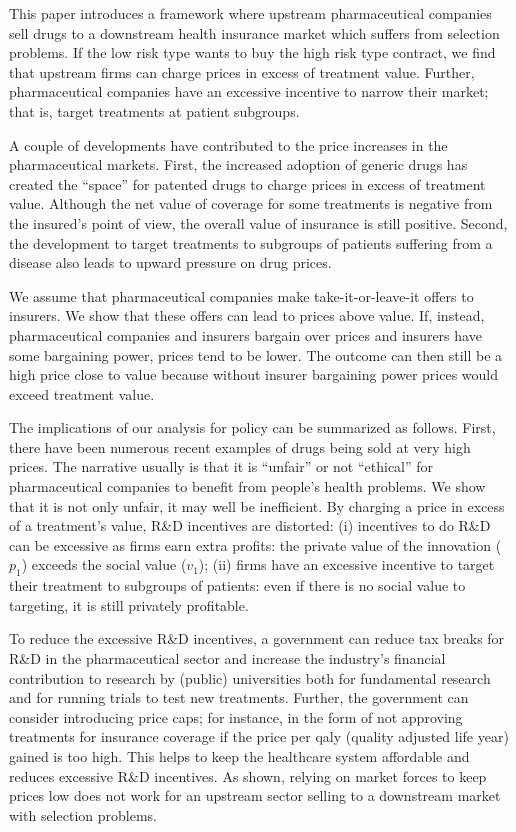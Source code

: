 \documentclass[a4paper,12pt]{article}
\begin{document}
This paper introduces a framework where upstream pharmaceutical companies sell drugs to a downstream health insurance market which suffers from selection problems. If the low risk type wants to buy the high risk type contract, we find that upstream firms can charge prices in excess of treatment value. Further, pharmaceutical companies have an excessive incentive to narrow their market; that is, target treatments at patient subgroups.

A couple of developments have contributed to the price increases in the pharmaceutical markets. First, the increased adoption of generic drugs has created the ``space'' for patented drugs to charge prices in excess of treatment value. Although the net value of coverage for some treatments is negative from the insured's point of view, the overall value of insurance is still positive. Second, the development to target treatments to subgroups of patients suffering from a disease also leads to upward pressure on drug prices. 

We assume that pharmaceutical companies make take-it-or-leave-it offers to insurers. We show that these offers can lead to prices above value. If, instead, pharmaceutical companies and insurers bargain over prices and insurers have some bargaining power, prices tend to be lower. The outcome can then still be a high price close to value because without insurer bargaining power prices would exceed treatment value.

The implications of our analysis for policy can be summarized as follows. First, there have been numerous recent examples of drugs being sold at very high prices. The narrative usually is that it is ``unfair'' or not ``ethical'' for pharmaceutical companies to benefit from people's health problems. We show that it is not only unfair, it may well be inefficient. By charging a price in excess of a treatment's value, R\&D incentives are distorted: (i) incentives to do R\&D can be excessive as firms earn extra profits: the private value of the innovation (\(p_1\)) exceeds the social value (\(v_1\)); (ii) firms have an excessive incentive to target their treatment to subgroups of patients: even if there is no social value to targeting, it is still privately profitable.

To reduce the excessive R\&D incentives, a government can reduce tax breaks for R\&D in the pharmaceutical sector and increase the industry's financial contribution to research by (public) universities both for fundamental research and for running trials to test new treatments. Further, the government can consider introducing price caps; for instance, in the form of not approving treatments for insurance coverage if the price per qaly (quality adjusted life year) gained is too high. This helps to keep the healthcare system affordable and reduces excessive R\&D incentives. As shown, relying on market forces to keep prices low does not work for an upstream sector selling to a downstream market with selection problems.
\end{document}
